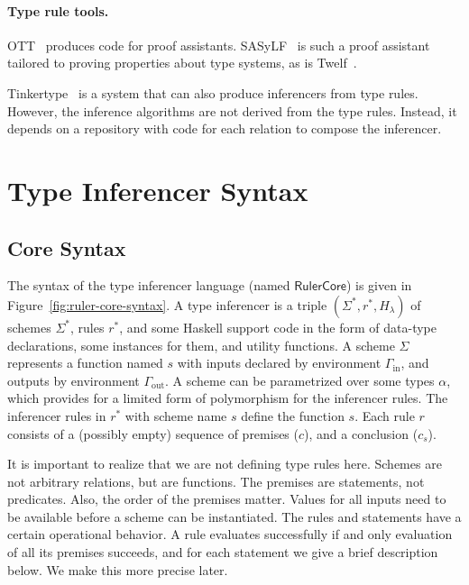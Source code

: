 \documentclass[preprint,natbib]{sigplanconf}
\newcommand\Rule{r}
\newcommand\Rules{\Rule^*}
\newcommand\Statement{c}
\newcommand\Env{\Gamma}
\newcommand\Scheme{\Sigma}
\newcommand\Schemes{\Scheme^*}
\newcommand\SchemeName{s}
\newcommand\In{\mbox{in}}
\newcommand\Out{\mbox{out}}
\newcommand\Haskell{H_{\!\lambda}}
\newcommand\RulerCore{\ensuremath{\mathsf{Ruler Core}}}
\begin{document}
    \paragraph{Type rule tools.}
    OTT~\cite{DBLP:conf/icfp/SewellNOPRSS07} produces code for proof assistants. SASyLF~\cite{1411266} is such a proof assistant
    tailored to proving properties about type systems, as is Twelf~\cite{DBLP:journals/jfp/HarperL07}.
    
    Tinkertype~\cite{DBLP:journals/jfp/LevinP03} is a system that can also produce inferencers from type rules. However, the
    inference algorithms are not derived from the type rules. Instead, it depends on a repository with code for each relation
    to compose the inferencer.


\section{Type Inferencer Syntax}
\label{sect:syntax}

  \subsection{Core Syntax}

    The syntax of the type inferencer language (named \RulerCore) is given in
    Figure~\ref{fig:ruler-core-syntax}. A type inferencer is a triple $(\Schemes,\Rules,\Haskell)$
    of schemes $\Schemes$, rules $\Rules$, and some Haskell support code in the form of
    data-type declarations, some instances for them, and utility functions. A scheme $\Scheme$
    represents a function named $\SchemeName$ with inputs declared by environment $\Env_{\In}$, and
    outputs by environment $\Env_{\Out}$. A scheme can be parametrized over some types $\alpha$,
    which provides for a limited form of polymorphism for the inferencer rules.
    The inferencer rules in $\Rules$ with scheme name $\SchemeName$
    define the function $\SchemeName$. Each rule $\Rule$ consists of a (possibly empty) sequence of
    premises ($\Statement$), and a conclusion ($\Statement_{\SchemeName}$).

    It is important to realize that we are not defining type rules here. Schemes are not
    arbitrary relations, but are functions. The premises are statements, not predicates. Also,
    the order of the premises matter. Values for all inputs need to be available before
    a scheme can be instantiated. The rules and statements have a certain operational behavior.
    A rule evaluates successfully if and only evaluation of all its premises succeeds, and for
    each statement we give a brief description below. We make this more precise later.
\end{document}

